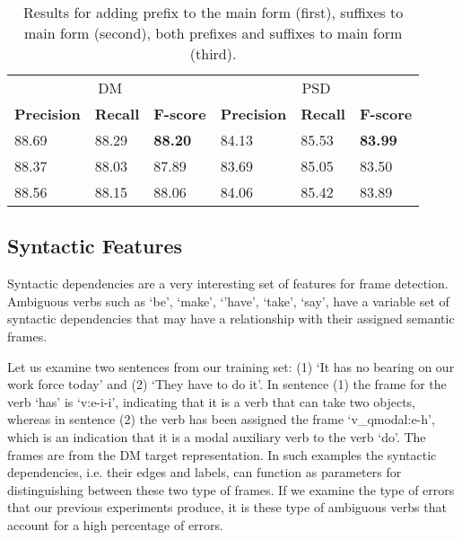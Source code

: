 \begin{table}
    \centering
    \smaller[0.2]
    \begin{tabular}{@{}llllll@{}}
        \toprule
        \multicolumn{3}{c}{DM}
        & \multicolumn{3}{c}{PSD} \\
        \textbf{Precision} & \textbf{Recall} & \textbf{F-score} & \textbf{Precision} & \textbf{Recall} & \textbf{F-score} \\
        \midrule
        88.69 & 88.29 & \textbf{88.20} & 84.13 & 85.53 & \textbf{83.99} \\
        88.37 & 88.03 & 87.89 & 83.69 & 85.05 & 83.50 \\
        88.56 & 88.15 & 88.06 & 84.06 & 85.42 & 83.89 \\
        \bottomrule
    \end{tabular}
    \caption{Results for adding prefix to the main form (first), suffixes to main form (second), both prefixes and suffixes to main form (third).}
    \label{table:affix_suffix}
\end{table}






\subsection{Syntactic Features}
\label{results_syn}



Syntactic dependencies are a very interesting set of features for frame detection. Ambiguous verbs such as `be', `make', `'have', `take', `say', have a variable set of syntactic dependencies that may have a relationship with their assigned semantic frames.

Let us examine two sentences from our training set: (1) `It has no bearing on our work force today' and (2) `They have to do it'. In sentence (1) the frame for the verb `has' is `v:e-i-i', indicating that it is a verb that can take two objects, whereas in sentence (2) the verb has been assigned the frame `v\_qmodal:e-h', which is an indication that it is a modal auxiliary verb to the verb `do'. The frames are from the DM target representation. In such examples the syntactic dependencies, i.e. their edges and labels, can function as parameters for distinguishing between these two type of frames. If we examine the type of errors that our previous experiments produce, it is these type of ambiguous verbs that account for a high percentage of errors.

